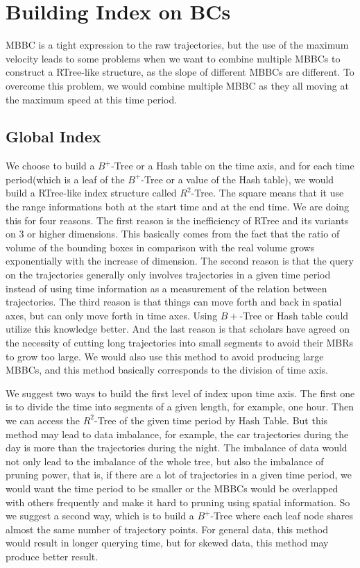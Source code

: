 \documentclass[sigplan]{acmart}
\begin{document}
\section{Building Index on BCs}
MBBC is a tight expression to the raw trajectories, but the use of the maximum velocity leads to some problems when we want to combine multiple MBBCs to construct a RTree-like structure, as the slope of different MBBCs are different. To overcome this problem, we would combine multiple MBBC as they all moving at the maximum speed at this time period.
\subsection{Global Index}
We choose to build a $B^+$-Tree or a Hash table on the time axis, and for each time period(which is a leaf of the $B^+$-Tree or a value of the Hash table), we would build a RTree-like index structure called $R^2$-Tree. The square means that it use the range informations both at the start time and at the end time. We are doing this for four reasons.
\indent The first reason is the inefficiency of RTree and its variants on 3 or higher dimensions. This basically comes from the fact that the ratio of volume of the bounding boxes in comparison with the real volume grows exponentially with the increase of dimension.
\indent The second reason is that the query on the trajectories generally only involves trajectories in a given time period instead of using time information as a measurement of the relation between trajectories.
\indent The third reason is that things can move forth and back in spatial axes, but can only move forth in time axes. Using $B+$-Tree or Hash table could utilize this knowledge better.
\indent And the last reason is that scholars have agreed on the necessity of cutting long trajectories into small segments to avoid their MBRs to grow too large. We would also use this method to avoid producing large MBBCs, and this method basically corresponds to the division of time axis.\par

We suggest two ways to build the first level of index upon time axis. The first one is to divide the time into segments of a given length, for example, one hour. Then we can access the $R^2$-Tree of the given time period by Hash Table. But this method may lead to data imbalance, for example, the car trajectories during the day is more than the trajectories during the night. The imbalance of data would not only lead to the imbalance of the whole tree, but also the imbalance of pruning power, that is, if there are a lot of trajectories in a given time period, we would want the time period to be smaller or the MBBCs would be overlapped with others frequently and make it hard to pruning using spatial information. So we suggest a second way, which is to build a $B^+$-Tree where each leaf node shares almost the same number of trajectory points. For general data, this method would result in longer querying time, but for skewed data, this method may produce better result.\par
\end{document}
